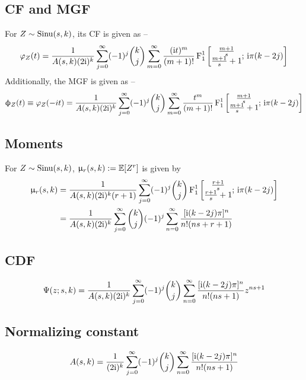 \subsection{CF and MGF}
\begin{thm} \label{thm:cfmgf}
	For $Z \sim \operatorname*{Sinu}(s,k)$, its CF is given as --
	\begin{equation}\label{eq:cf}
		\varphi_Z(t) = \frac{1}{A(s,k) (2\mathrm i)^k} \sum_{j=0}^{\infty} (-1)^j \binom{k}{j} \sum_{m=0}^{\infty} \frac{(\mathrm i t)^m}{(m+1)!} \operatorname{F}^1_1\left[ \begin{matrix}\frac{m+1}{s}\\ \frac{m+1}{s} + 1 \end{matrix};\, \mathrm i\pi(k-2j) \right]
	\end{equation}
	Additionally, the MGF is given as --
	\begin{equation}
		\upphi_Z(t) \equiv \varphi_Z(-it) = \frac{1}{A(s,k) (2\mathrm i)^k} \sum_{j=0}^{\infty} (-1)^j \binom{k}{j} \sum_{m=0}^{\infty} \frac{t^m}{(m+1)!} \operatorname{F}^1_1\left[ \begin{matrix}\frac{m+1}{s}\\ \frac{m+1}{s} + 1 \end{matrix};\, \mathrm i\pi(k-2j) \right]
	\end{equation}
\end{thm}

\subsection{Moments}
\begin{thm}\label{thm:moments}
	For $Z \sim \operatorname*{Sinu}(s,k)$, $\upmu_r(s,k) := \mathbb E [Z^r]$ is given by
	\begin{align}
		\upmu_r(s,k) &= \frac{1}{A(s,k) (2\mathrm i)^k (r+1)} \sum_{j=0}^{\infty} (-1)^j \binom{k}{j} \operatorname{F}^1_1 \left[ \begin{matrix}\frac{r+1}{s}\\ \frac{r+1}{s} + 1\end{matrix}; \, \mathrm i\pi(k-2j) \right]\\
		&= \frac{1}{A(s,k) (2\mathrm i)^k} \sum_{j=0}^\infty {k \choose j} (-1)^j \sum_{n=0}^{\infty} \frac{[\mathrm i (k-2j) \pi]^n}{n! (ns+r+1)}
	\end{align}
\end{thm}

\subsection{CDF}
\begin{thm}\label{thm:cdf}
	\begin{equation}
		\Psi(z; s,k) = \frac{1}{A(s,k) (2\mathrm i)^k} \sum_{j=0}^\infty (-1)^j {k \choose j} \sum_{n=0}^{\infty} \frac{[\mathrm i (k-2j) \pi]^n}{n! (ns+1)} z^{ns+1}
	\end{equation}
\end{thm}

\subsection{Normalizing constant}
\begin{thm}
	\[A(s,k) = \frac{1}{(2\mathrm i)^k} \sum_{j=0}^\infty (-1)^j {k \choose j} \sum_{n=0}^{\infty} \frac{[\mathrm i (k-2j) \pi]^n}{n! (ns+1)} \]
\end{thm}


